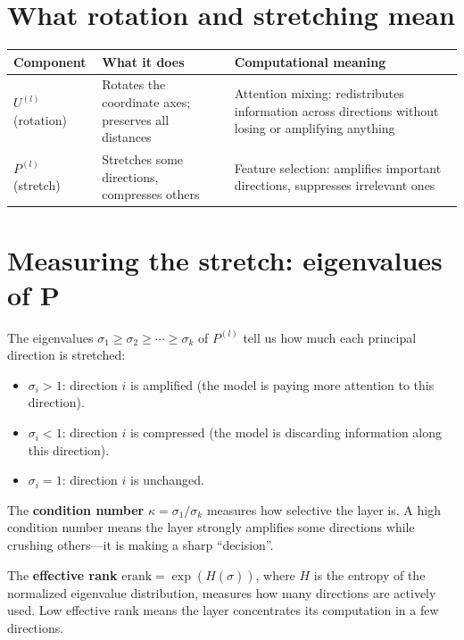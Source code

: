 \documentclass[11pt, twoside, openright]{memoir}
\begin{document}
\section{What rotation and stretching mean}

\begin{center}
\renewcommand{\arraystretch}{1.5}
\begin{tabular}{@{}L{2cm} L{4cm} L{4.5cm}@{}}
\toprule
\textbf{Component} & \textbf{What it does} & \textbf{Computational meaning} \\
\midrule
$U^{(l)}$ (rotation) &
  Rotates the coordinate axes; preserves all distances &
  Attention mixing: redistributes information across directions without
  losing or amplifying anything \\
$P^{(l)}$ (stretch) &
  Stretches some directions, compresses others &
  Feature selection: amplifies important directions, suppresses
  irrelevant ones \\
\bottomrule
\end{tabular}
\end{center}

\section{Measuring the stretch: eigenvalues of P}

The eigenvalues $\sigma_1 \geq \sigma_2 \geq \cdots \geq \sigma_k$ of
$P^{(l)}$ tell us how much each principal direction is stretched:

\begin{itemize}[nosep]
\item $\sigma_i > 1$: direction $i$ is amplified (the model is paying
  more attention to this direction).
\item $\sigma_i < 1$: direction $i$ is compressed (the model is
  discarding information along this direction).
\item $\sigma_i = 1$: direction $i$ is unchanged.
\end{itemize}

The \textbf{condition number} $\kappa = \sigma_1 / \sigma_k$ measures how
selective the layer is. A high condition number means the layer strongly
amplifies some directions while crushing others---it is making a sharp
``decision''.

The \textbf{effective rank} $\text{erank} = \exp(H(\hat\sigma))$, where
$H$ is the entropy of the normalized eigenvalue distribution, measures how
many directions are actively used. Low effective rank means the layer
concentrates its computation in a few directions.
\end{document}

